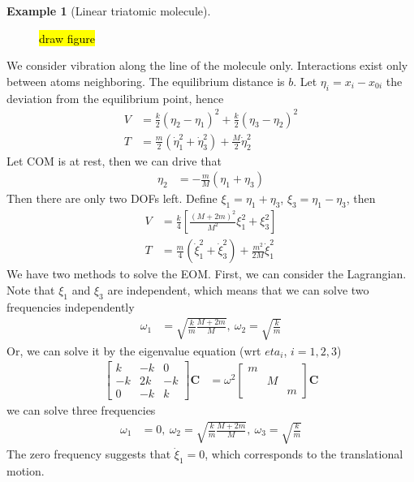 \documentclass[twoside,9pt]{article}
\numberwithin{equation}{section} %
\newcommand{\lms}{\fontfamily{lmss}\selectfont} %
\theoremstyle{definition}
\newtheorem{example}{\lms Example}[section]
\theoremstyle{remark}
\begin{document}
\begin{example}[Linear triatomic molecule]~
\begin{figure}[H]
    \centering
    \hl{draw figure}
\end{figure}
We consider vibration along the line of the molecule only.
Interactions exist only between atoms neighboring.
The equilibrium distance is $b$.
Let $\eta_i=x_i-x_{0i}$ the deviation from the equilibrium point,
hence
\begin{align*}
    V &= 
    \frac{k}{2}(\eta_2 - \eta_1)^2 + 
    \frac{k}{2}(\eta_3 - \eta_2)^2 \\
    T &= \frac{m}{2}(\dot\eta_1^2 + \dot\eta_3^2) + \frac{M}{2}\dot\eta_2^2
\end{align*}
Let COM is at rest, then we can drive that
\begin{align*}
    \eta_2 &= -\frac{m}{M}(\eta_1 + \eta_3)
\end{align*}
Then there are only two DOFs left.
Define $\xi_1 = \eta_1 + \eta_3$, $\xi_3 = \eta_1 - \eta_3$,
then
\begin{align*}
    V &= \frac{k}{4}\left[
        \frac{(M+2m)^2}{M^2}\xi_1^2 + \xi_3^2
    \right]\\
    T &= \frac{m}{4}(\dot\xi_1^2 + \dot\xi_3^2) + \frac{m^2}{2M}\dot\xi_1^2
\end{align*}
We have two methods to solve the EOM. 
First, we can consider the Lagrangian.
Note that $\xi_1$ and $\xi_3$ are independent,
which means that we can solve two frequencies independently
\begin{align*}
    \omega_1 &= \sqrt{\frac{k}{m}\frac{M+2m}{M}},~ 
    \omega_2  = \sqrt{\frac{k}{m}}
\end{align*}
Or, we can solve it by the eigenvalue equation (wrt $eta_i$, $i=1,2,3$)
\begin{align*}
    \begin{bmatrix}
        k & -k & 0 \\
        -k & 2k & -k \\
        0 & -k & k
    \end{bmatrix}
    \mathbf C &= 
    \omega^2
    \begin{bmatrix}
        m & & \\
          & M & \\
          & & m
    \end{bmatrix}
    \mathbf C
\end{align*}
we can solve three frequencies
\begin{align*}
    \omega_1 &= 0,~
    \omega_2  = \sqrt{\frac{k}{m}\frac{M+2m}{M}},~ 
    \omega_3  = \sqrt{\frac{k}{m}}
\end{align*}
The zero frequency suggests that $\dot\xi_1 = 0$,
which corresponds to the translational motion. 


\end{example}



\end{document}
